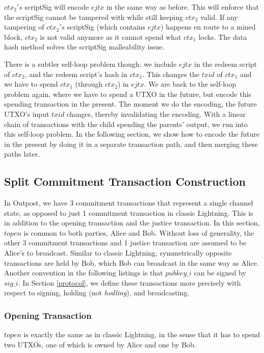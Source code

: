 $\mathit{ctx_2's}$ scriptSig will encode $\mathit{ejtx}$ in the same way as before. This will enforce that the scriptSig cannot be tampered with while still keeping $\mathit{ctx_2}$ valid. If any tampering of $\mathit{ctx_2's}$ scriptSig (which contains $\mathit{ejtx}$) happens en route to a mined block, $\mathit{ctx_2}$ is not valid anymore as it cannot spend what $\mathit{ctx_1}$ locks. The data hash method solves the scriptSig malleability issue. 

There is a subtler self-loop problem though: we include $\mathit{ejtx}$ in the redeem script of $\mathit{ctx_2}$, and the redeem script's hash in $\mathit{ctx_1}$. This changes the $\mathit{txid}$ of $\mathit{ctx_1}$ and we have to spend $\mathit{ctx_1}$ (through $\mathit{ctx_2}$) in $\mathit{ejtx}$. We are back to the self-loop problem again, where we have to spend a UTXO in the future, but encode this spending transaction in the present. The moment we do the encoding, the future UTXO's input $\mathit{txid}$ changes, thereby invalidating the encoding. With a linear chain of transactions with the child spending the parents' output, we run into this self-loop problem. In the following section, we show how to encode the future in the present by doing it in a separate transaction path, and then merging these paths later.

\subsection{Split Commitment Transaction Construction}
In Outpost, we have 3 commitment transactions that represent a single channel state, as opposed to just 1 commitment transaction in classic Lightning. This is in addition to the opening transaction and the justice transaction. In this section, $\mathit{topen}$ is common to both parties, Alice and Bob. Without loss of generality, the other 3 commitment transactions and 1 justice transaction are assumed to be Alice's to broadcast. Similar to classic Lightning, symmetrically opposite transactions are held by Bob, which Bob can broadcast in the same way as Alice. Another convention in the following listings is that $pubkey\_i$ can be signed by $sig\_i$. In Section \ref{protocol}, we define these transactions more precisely with respect to signing, holding (not \textit{hodling}), and broadcasting.
\subsubsection{Opening Transaction}
$\mathit{topen}$ is exactly the same as in classic Lightning, in the sense that it has to spend two UTXOs, one of which is owned by Alice and one by Bob. 

